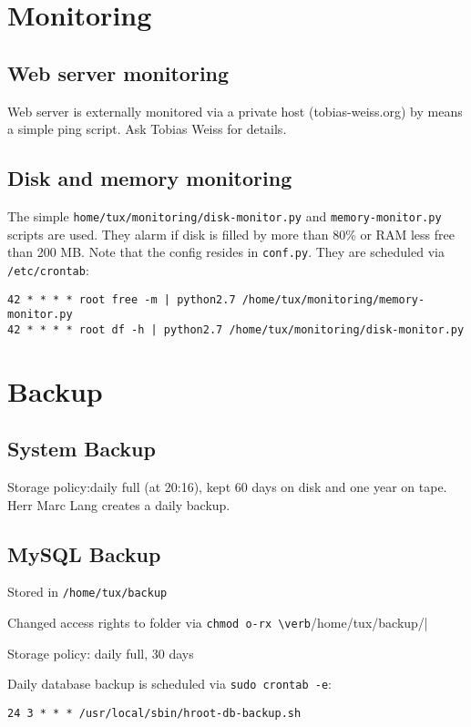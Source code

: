 \documentclass{article}
\begin{document}
\section{Monitoring}
\subsection{Web server monitoring}
Web server is externally monitored via a private host (tobias-weiss.org) by means a simple ping script.
Ask Tobias Weiss for details.

\subsection{Disk and memory monitoring}
The simple \verb|home/tux/monitoring/disk-monitor.py| and \verb|memory-monitor.py| scripts are used.
They alarm if disk is filled by more than 80\% or RAM less free than 200 MB.
Note that the config resides in \verb|conf.py|.
They are scheduled via \verb|/etc/crontab|:
\begin{lstlisting}
42 * * * * root free -m | python2.7 /home/tux/monitoring/memory-monitor.py
42 * * * * root df -h | python2.7 /home/tux/monitoring/disk-monitor.py
\end{lstlisting}

\section{Backup}
\subsection{System Backup}
Storage policy:daily full (at 20:16), kept 60 days on disk and one year on tape.
Herr Marc Lang creates a daily backup.

\subsection{MySQL Backup}
Stored in \verb|/home/tux/backup|

Changed access rights to folder via \verb|chmod o-rx \verb|/home/tux/backup/|

Storage policy: daily full, 30 days

Daily database backup is scheduled via \verb|sudo crontab -e|:
\begin{lstlisting}   
24 3 * * * /usr/local/sbin/hroot-db-backup.sh 
\end{lstlisting}
\end{document}
